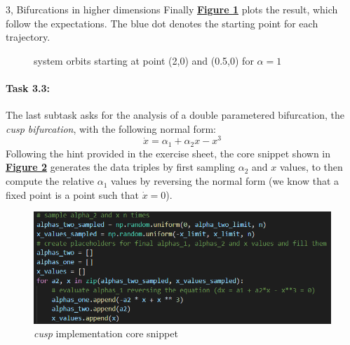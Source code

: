 \documentclass[10pt,a4paper]{article}
\begin{document}
\begin{task}{3, Bifurcations in higher dimensions}
Finally \textbf{\hyperref[fig:trajectories]{Figure \ref{fig:trajectories}}} plots the result, which follow the expectations. The blue dot denotes the starting point for each trajectory.
\begin{figure}[H]
    \centering
    \hfill
    \caption{system orbits starting at point (2,0) and (0.5,0) for $\alpha = 1$}
    \label{fig:trajectories}
\end{figure}



\paragraph{Task 3.3:}
The last subtask asks for the analysis of a double parametered bifurcation, the \textit{cusp bifurcation}, with the following normal form:
$$\dot x = \alpha_1 + \alpha_2 x - x^3$$
Following the hint provided in the exercise sheet, the core snippet shown in \textbf{\hyperref[fig:cusp-code]{Figure \ref{fig:cusp-code}}} generates the data triples by first sampling $\alpha_2$ and $x$ values, to then compute the relative $\alpha_1$ values by reversing the normal form (we know that a fixed point is a point such that $\dot x = 0$). 

\begin{figure}[H]
    \centering
    \includegraphics[scale=1]{images/cusp_bifurc.png}
    \caption{\textit{cusp} implementation core snippet}
    \label{fig:cusp-code}
\end{figure}


\end{task}
\end{document}
